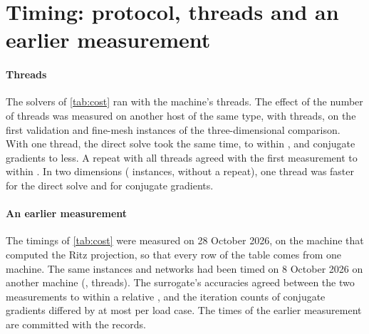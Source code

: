 \section{Timing: protocol, threads and an earlier measurement}\label{supp:timing}



\paragraph{Threads}

The solvers of \cref{tab:cost} ran with the machine's \numCostThreads{} threads. The effect
of the number of threads was measured on another host of the same type, with
\numThreadsHost{} threads, on the first \numThreadsValN{} validation and \numThreadsFineN{}
fine-mesh instances of the three-dimensional comparison. With one thread, the direct solve
took the same time, to within \numThreadsDirectDev{}, and conjugate gradients
\numThreadsCgGainMin{} to \numThreadsCgGainMax{} less. A repeat with all threads agreed with
the first measurement to within \numThreadsDrift{}. In two dimensions (\numThreadsTwoN{}
instances, without a repeat), one thread was \numThreadsTwoDirect{} faster for the direct
solve and \numThreadsTwoCg{} for conjugate gradients.

\paragraph{An earlier measurement}
The timings of \cref{tab:cost} were measured on 28 October 2026, on the machine
that computed the Ritz projection, so that every row of the table comes from one machine.
The same instances and networks had been timed on 8 October 2026 on another machine
(\numRerunCpu{}, \numRerunThreads{} threads). The surrogate's accuracies agreed between the
two measurements to within a relative \numRerunAccDev{}, and the iteration counts of
conjugate gradients differed by at most \numRerunIters{} per load case. The times of the
earlier measurement are committed with the records.
